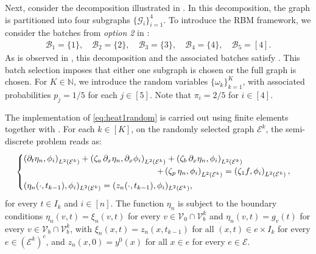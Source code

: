 \documentclass[a4paper, 10pt, english]{article}
\def\N{\mathbb N}
\begin{document}
Next, consider the decomposition illustrated in . In this decomposition, the graph is partitioned into four subgraphs $\{\mathcal{G}_i\}_{i=1}^4$. To introduce the RBM framework, we consider the batches from \textit{option 2} in :
\begin{align}\label{eq:decompostion1}
    \mathcal{B}_1 =\{1\},\quad \mathcal{B}_2 =\{2\},\quad \mathcal{B}_3 =\{3\},\quad \mathcal{B}_4 =\{4\},\quad \mathcal{B}_5 =[4].
\end{align}
As is observed in , this decomposition and the associated batches satisfy . This batch selection imposes that either one subgraph is chosen or the full graph is chosen. For $K\in \N$, we introduce the random variables $\{\omega_k\}_{k=1}^K$, with associated probabilities $p_j=1/5$ for each $j\in[5]$. Note that $\pi_i=2/5$ for $i\in[4]$. 

The implementation of \eqref{eq:heat1random} is carried out using finite elements together with . For each $k\in[K]$, on the randomly selected graph $\mathcal{E}^k$, the semi-discrete problem reads as:
\begin{align}\label{eq:semi_discrete_random}
    \begin{cases}
        \left(\partial_t \eta_n,\phi_i\right)_{L^2(\mathcal{E}^k)} + \left(\zeta_a\,\partial_x \eta_n, \partial_x \phi_i\right)_{L^2(\mathcal{E}^k)} + \left(\zeta_b\,\partial_x \eta_n, \phi_i\right)_{L^2(\mathcal{E}^k)}\\
        \hspace{5.5cm}+ \left(\zeta_p\,\eta_n, \phi_i\right)_{L^2(\mathcal{E}^k)} = \left(\zeta_1 f, \phi_i\right)_{L^2(\mathcal{E}^k)},\\[1mm]
        (\eta_n(\cdot,t_{k-1}), \phi_i)_{L^2(\mathcal{E}^k)} = (z_n(\cdot,t_{k-1}), \phi_i)_{L^2(\mathcal{E}^k)},
    \end{cases}
\end{align}
for every $t\in I_k$ and $i\in[n]$. The function $\eta_n$ is subject to the boundary conditions $\eta_n(v,t)=\xi_n(v,t)$ for every $v\in \mathcal{V}_0\cap \mathcal{V}_b^k$ and $\eta_n(v,t)=g_v(t)$ for every $v\in \mathcal{V}_b\cap \mathcal{V}_b^k$, with $\xi_n(x,t)=z_n(x,t_{k-1})$ for all $(x,t)\in e\times I_k$ for every $e\in (\mathcal{E}^k)^c$, and $z_n(x,0) =y^0(x)$ for all $x\in e$ for every $e\in \mathcal{E}$.
\end{document}
